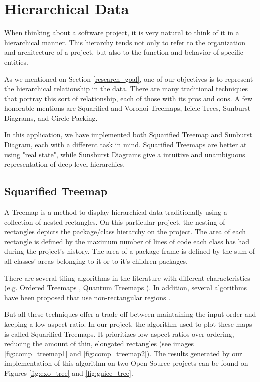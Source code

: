 \section{Hierarchical Data} \label{sec:hierarchy}
When thinking about a software project, it is very natural to think of it in a hierarchical manner. This hierarchy tends not only to refer to the organization and architecture of a project, but also to the function and behavior of specific entities.

As we mentioned on Section \ref{research_goal}, one of our objectives is to represent the hierarchical relationship in the data. There are many traditional techniques that portray this sort of relationship, each of those with its pros and cons. A few honorable mentions are Squarified \cite{ref:squarified} and Voronoi \cite{ref:tree2} Treemaps, Icicle Trees, Sunburst Diagrams, and Circle Packing.

In this application, we have implemented both Squarified Treemap and Sunburst Diagram, each with a different task in mind. Squarified Treemaps are better at using "real state", while Sunsburst Diagrams give a intuitive and unambiguous representation of deep level hierarchies.

\subsection{Squarified Treemap}
A Treemap is a method to display hierarchical data traditionally using a collection of nested rectangles. On this particular project, the nesting of rectangles depicts the package/class hierarchy on the project. The area of each rectangle is defined by the maximum number of lines of code each class has had during the project's history. The area of a package frame is defined by the sum of all classes' areas belonging to it or to it's children packages.

There are several tiling algorithms in the literature with different characteristics (e.g. Ordered Treemaps \cite{ref:orderedtreemap}, Quantum Treemaps \cite{ref:quantumtreemap}). In addition, several algorithms have been proposed that use non-rectangular regions  \cite{ref:tree1,ref:tree2,ref:tree3}.

But all these techniques offer a trade-off between maintaining the input order and keeping a low aspect-ratio. In our project, the algorithm used to plot these maps is called Squarified Treemaps\cite{ref:squarified}. It prioritizes low aspect-ratios over ordering, reducing the amount of thin, elongated rectangles (see images \ref{fig:comp_treemap1} and \ref{fig:comp_treemap2}). The results generated by our implementation of this algorithm on two Open Source projects can be found on Figures \ref{fig:exo_tree} and \ref{fig:guice_tree}.

